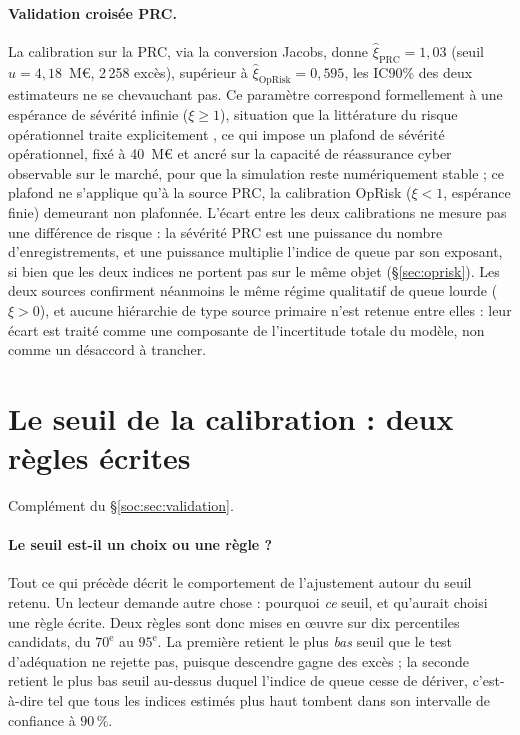 \paragraph{Validation croisée PRC.} La calibration sur la PRC, via la
conversion Jacobs, donne $\hat{\xi}_{\text{PRC}} = 1{,}03$ (seuil
$u = 4{,}18$~M\euro, 2\,258 excès), supérieur à
$\hat{\xi}_{\text{OpRisk}} = 0{,}595$, les IC90\% des deux estimateurs ne se
chevauchant pas. Ce paramètre correspond formellement à une espérance de
sévérité infinie ($\xi \geq 1$), situation que la littérature du risque opérationnel
traite explicitement \citep{neslehova2006}, ce qui impose un plafond de sévérité
opérationnel, fixé à 40~M\euro{} et ancré sur la capacité de réassurance cyber
observable sur le marché, pour que la simulation reste numériquement
stable ; ce plafond ne s'applique qu'à la source PRC, la calibration OpRisk
($\xi < 1$, espérance finie) demeurant non plafonnée. L'écart entre
les deux calibrations ne mesure pas une différence de risque : la sévérité PRC
est une puissance du nombre d'enregistrements, et une puissance multiplie
l'indice de queue par son exposant, si bien que les deux indices ne portent pas
sur le même objet (\S\ref{sec:oprisk}). Les deux sources confirment
néanmoins le même régime qualitatif de queue lourde ($\xi > 0$), et aucune
hiérarchie de type \og source primaire\fg{} n'est retenue entre elles : leur
écart est traité comme une composante de l'incertitude totale du modèle,
non comme un désaccord à trancher.

\section{Le seuil de la calibration : deux règles écrites}
\label{sec:ann-seuil}


Complément du \S\ref{soc:sec:validation}.

\paragraph{Le seuil est-il un choix ou une règle ?}
Tout ce qui précède décrit le comportement de l'ajustement autour du seuil retenu. Un lecteur
demande autre chose : pourquoi \emph{ce} seuil, et qu'aurait choisi une règle écrite. Deux règles
sont donc mises en \oe uvre sur dix percentiles candidats, du $70^{\text{e}}$ au $95^{\text{e}}$.
La première retient le plus \emph{bas} seuil que le test d'adéquation ne rejette pas, puisque
descendre gagne des excès ; la seconde retient le plus bas seuil au-dessus duquel l'indice de
queue cesse de dériver, c'est-à-dire tel que tous les indices estimés plus haut tombent dans son
intervalle de confiance à $90\,\%$.

